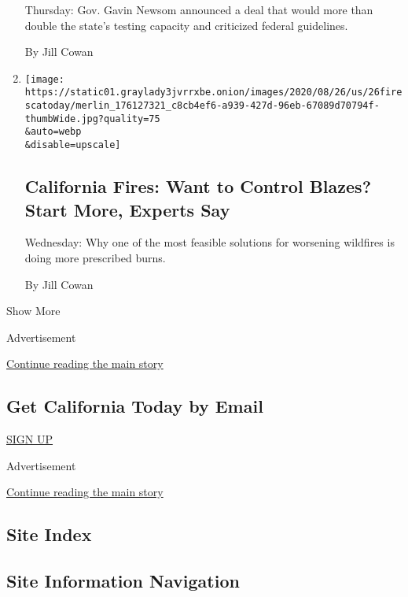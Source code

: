 \begin{enumerate}
  Thursday: Gov. Gavin Newsom announced a deal that would more than
  double the state's testing capacity and criticized federal guidelines.

  By Jill Cowan
\item
  \href{/2020/08/26/us/california-fire-prevention.html}{}

  \texttt{[image: https://static01.graylady3jvrrxbe.onion/images/2020/08/26/us/26firescatoday/merlin\_176127321\_c8cb4ef6-a939-427d-96eb-67089d70794f-thumbWide.jpg?quality=75\\\&auto=webp\\\&disable=upscale]}

  \hypertarget{california-fires-want-to-control-blazes-start-more-experts-say}{%
  \subsection{California Fires: Want to Control Blazes? Start More,
  Experts
  Say}\label{california-fires-want-to-control-blazes-start-more-experts-say}}

  Wednesday: Why one of the most feasible solutions for worsening
  wildfires is doing more prescribed burns.

  By Jill Cowan
\end{enumerate}

Show More

Advertisement

\protect\hyperlink{after-mid1}{Continue reading the main story}

\hypertarget{get-california-today-by-email}{%
\subsection{Get California Today by
Email}\label{get-california-today-by-email}}

\href{/newsletters/signup/CA}{SIGN UP}

Advertisement

\protect\hyperlink{after-mktg}{Continue reading the main story}

\hypertarget{site-index}{%
\subsection{Site Index}\label{site-index}}

\hypertarget{site-information-navigation}{%
\subsection{Site Information
Navigation}\label{site-information-navigation}}

